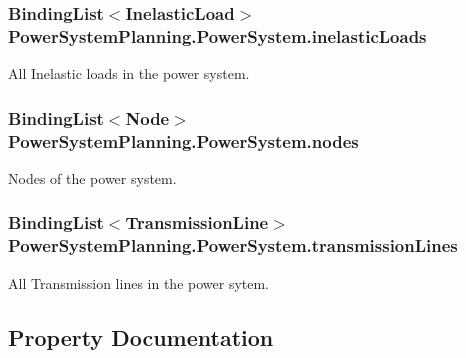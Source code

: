 \subsubsection[{\texorpdfstring{inelastic\+Loads}{inelasticLoads}}]{\setlength{\rightskip}{0pt plus 5cm}Binding\+List$<${\bf Inelastic\+Load}$>$ Power\+System\+Planning.\+Power\+System.\+inelastic\+Loads}\hypertarget{class_power_system_planning_1_1_power_system_a0445fbb84b2deb936cfc1b7b38d8f5ed}{}\label{class_power_system_planning_1_1_power_system_a0445fbb84b2deb936cfc1b7b38d8f5ed}


All Inelastic loads in the power system. 

\subsubsection[{\texorpdfstring{nodes}{nodes}}]{\setlength{\rightskip}{0pt plus 5cm}Binding\+List$<${\bf Node}$>$ Power\+System\+Planning.\+Power\+System.\+nodes}\hypertarget{class_power_system_planning_1_1_power_system_aa5709bbb488708bcb162646585f01c79}{}\label{class_power_system_planning_1_1_power_system_aa5709bbb488708bcb162646585f01c79}


Nodes of the power system. 

\subsubsection[{\texorpdfstring{transmission\+Lines}{transmissionLines}}]{\setlength{\rightskip}{0pt plus 5cm}Binding\+List$<${\bf Transmission\+Line}$>$ Power\+System\+Planning.\+Power\+System.\+transmission\+Lines}\hypertarget{class_power_system_planning_1_1_power_system_a1394f9c3a23efcc0cd93acb46611c102}{}\label{class_power_system_planning_1_1_power_system_a1394f9c3a23efcc0cd93acb46611c102}


All Transmission lines in the power sytem. 



\subsection{Property Documentation}

